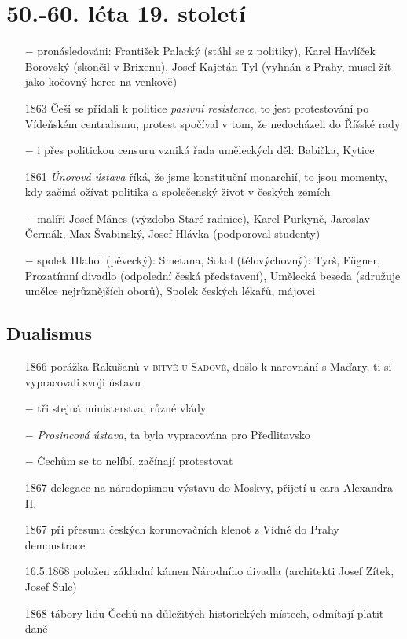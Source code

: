 \documentclass{article}
\begin{document}
\section*{50.-60. léta 19. století}
\begin{itemize}
    \vspace{-0.5em}
    \setlength\itemsep{0.15em}
    \item[$-$] pronásledováni: František Palacký (stáhl se z politiky), Karel Havlíček Borovský (skončil v Brixenu), Josef Kajetán Tyl (vyhnán z Prahy, musel žít jako kočovný herec na venkově)
    \item[1863] Češi se přidali k politice \textit{pasivní resistence}, to jest protestování po Vídeňském centralismu, protest spočíval v tom, že nedocházeli do Říšské rady
    \item[$-$] i přes politickou censuru vzniká řada uměleckých děl: Babička, Kytice
    \item[1861] \textit{Únorová ústava} říká, že jsme konstituční monarchií, to jsou momenty, kdy začíná ožívat politika a společenský život v českých zemích
    \item[$-$] malíři Josef Mánes (výzdoba Staré radnice), Karel Purkyně, Jaroslav Čermák, Max Švabinský, Josef Hlávka (podporoval studenty)
    \item[$-$] spolek Hlahol (pěvecký): Smetana, Sokol (tělovýchovný): Tyrš, Fügner, Prozatímní divadlo (odpolední česká představení), Umělecká beseda (sdružuje umělce nejrůznějších oborů), Spolek českých lékařů, májovci
\end{itemize}

\subsection*{Dualismus}
\begin{itemize}
    \vspace{-0.5em}
    \setlength\itemsep{0.15em}
    \item[1866] porážka Rakušanů v \textsc{bitvě u Sadové}, došlo k narovnání s Maďary, ti si vypracovali svoji ústavu
    \item[$-$] tři stejná ministerstva, různé vlády
    \item[$-$] \textit{Prosincová ústava}, ta byla vypracována pro Předlitavsko
    \item[$-$] Čechům se to nelíbí, začínají protestovat
    \item[1867] delegace na národopisnou výstavu do Moskvy, přijetí u cara Alexandra II.
    \item[1867] při přesunu českých korunovačních klenot z Vídně do Prahy demonstrace
    \item[16.5.1868] položen základní kámen Národního divadla (architekti Josef Zítek, Josef Šulc)
    \item[1868] tábory lidu Čechů na důležitých historických místech, odmítají platit daně
\end{itemize}
\end{document}
